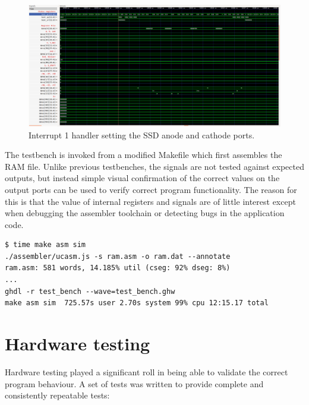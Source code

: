\documentclass[12pt,a4paper]{article}
\begin{document}
\begin{figure}[H]
  \centering
  \includegraphics[width=7.2in]{assets/t5.png}
  \caption{Interrupt 1 handler setting the SSD anode and cathode
    ports.}
\end{figure}

\noindent
The testbench is invoked from a modified Makefile which first
assembles the RAM file. Unlike previous testbenches, the signals are
not tested against expected outputs, but instead simple visual
confirmation of the correct values on the output ports can be used to
verify correct program functionality. The reason for this is that the
value of internal registers and signals are of little interest except
when debugging the assembler toolchain or detecting bugs in the
application code.

\begin{verbatim}
$ time make asm sim
./assembler/ucasm.js -s ram.asm -o ram.dat --annotate
ram.asm: 581 words, 14.185% util (cseg: 92% dseg: 8%)
...
ghdl -r test_bench --wave=test_bench.ghw
make asm sim  725.57s user 2.70s system 99% cpu 12:15.17 total
\end{verbatim}

\section{Hardware testing}

Hardware testing played a significant roll in being able to validate
the correct program behaviour. A set of tests was written to provide
complete and consistently repeatable tests:
\end{document}
